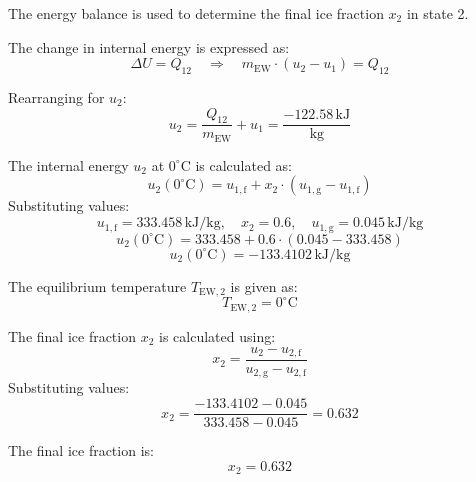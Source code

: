 The energy balance is used to determine the final ice fraction \( x_2 \) in state 2.  

The change in internal energy is expressed as:  
\[
\Delta U = Q_{12} \quad \Rightarrow \quad m_{\text{EW}} \cdot (u_2 - u_1) = Q_{12}
\]  

Rearranging for \( u_2 \):  
\[
u_2 = \frac{Q_{12}}{m_{\text{EW}}} + u_1 = \frac{-122.58 \, \text{kJ}}{\text{kg}}
\]  

The internal energy \( u_2 \) at \( 0^\circ\text{C} \) is calculated as:  
\[
u_2(0^\circ\text{C}) = u_{1,\text{f}} + x_2 \cdot (u_{1,\text{g}} - u_{1,\text{f}})
\]  
Substituting values:  
\[
u_{1,\text{f}} = 333.458 \, \text{kJ/kg}, \quad x_2 = 0.6, \quad u_{1,\text{g}} = 0.045 \, \text{kJ/kg}
\]  
\[
u_2(0^\circ\text{C}) = 333.458 + 0.6 \cdot (0.045 - 333.458)
\]  
\[
u_2(0^\circ\text{C}) = -133.4102 \, \text{kJ/kg}
\]  

The equilibrium temperature \( T_{\text{EW},2} \) is given as:  
\[
T_{\text{EW},2} = 0^\circ\text{C}
\]  

The final ice fraction \( x_2 \) is calculated using:  
\[
x_2 = \frac{u_2 - u_{2,\text{f}}}{u_{2,\text{g}} - u_{2,\text{f}}}
\]  
Substituting values:  
\[
x_2 = \frac{-133.4102 - 0.045}{333.458 - 0.045} = 0.632
\]  

The final ice fraction is:  
\[
x_2 = 0.632
\]